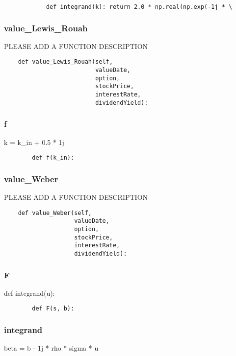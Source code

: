 \documentclass[twoside,11pt]{book}
\begin{document}
\begin{lstlisting}
            def integrand(k): return 2.0 * np.real(np.exp(-1j * \
\end{lstlisting}

\subsubsection*{{\bf value\_Lewis\_Rouah}}
PLEASE ADD A FUNCTION DESCRIPTION

\begin{lstlisting}
    def value_Lewis_Rouah(self,
                          valueDate,
                          option,
                          stockPrice,
                          interestRate,
                          dividendYield):
\end{lstlisting}

\subsubsection*{{\bf f}}
k = k\_in + 0.5 * 1j 

\begin{lstlisting}
        def f(k_in):
\end{lstlisting}

\subsubsection*{{\bf value\_Weber}}
PLEASE ADD A FUNCTION DESCRIPTION

\begin{lstlisting}
    def value_Weber(self,
                    valueDate,
                    option,
                    stockPrice,
                    interestRate,
                    dividendYield):
\end{lstlisting}

\subsubsection*{{\bf F}}
def integrand(u): 

\begin{lstlisting}
        def F(s, b):
\end{lstlisting}

\subsubsection*{{\bf integrand}}
beta = b - 1j * rho * sigma * u 
\end{document}
